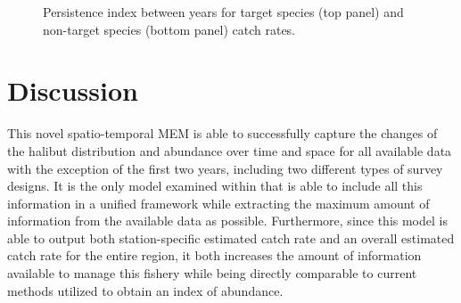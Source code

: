 \documentclass[12pt]{article}\usepackage[]{graphicx}\usepackage[]{color}
\begin{document}
\begin{figure}[htb]

{\centering {}  

}

\caption{Persistence index between years for target species (top panel) and non-target species (bottom panel) catch rates.}\label{fig:persist}
\end{figure}
\hypertarget{discussion}{%
\section{Discussion}\label{discussion}}

This novel spatio-temporal MEM is able to successfully capture the changes of the halibut distribution and abundance over time and space for all available data with the exception of the first two years, including two different types of survey designs. It is the only model examined within that is able to include all this information in a unified framework while extracting the maximum amount of information from the available data as possible. Furthermore, since this model is able to output both station-specific estimated catch rate and an overall estimated catch rate for the entire region, it both increases the amount of information available to manage this fishery while being directly comparable to current methods utilized to obtain an index of abundance.
\end{document}
